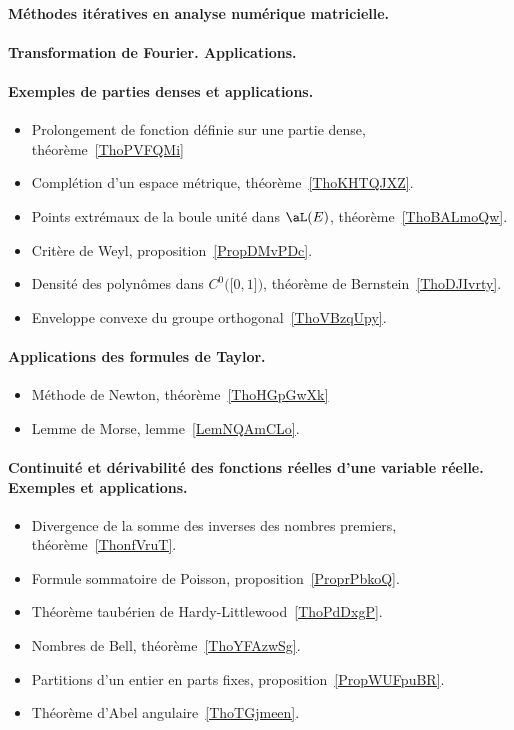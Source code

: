 \paragraph{Méthodes itératives en analyse numérique matricielle.}
\paragraph{Transformation de Fourier. Applications.}
\paragraph{Exemples de parties denses et applications.}
\begin{itemize}
    \item Prolongement de fonction définie sur une partie dense, théorème~\ref{ThoPVFQMi}
    \item Complétion d'un espace métrique, théorème~\ref{ThoKHTQJXZ}.
    \item Points extrémaux de la boule unité dans \( \aL(E)\), théorème~\ref{ThoBALmoQw}.
    \item Critère de Weyl, proposition~\ref{PropDMvPDc}.
    \item Densité des polynômes dans \( C^0\big( \mathopen[ 0 , 1 \mathclose] \big)\), théorème de Bernstein~\ref{ThoDJIvrty}.
    \item Enveloppe convexe du groupe orthogonal~\ref{ThoVBzqUpy}.
\end{itemize}
\paragraph{Applications des formules de Taylor.}
\begin{itemize}
    \item Méthode de Newton, théorème~\ref{ThoHGpGwXk}
    \item Lemme de Morse, lemme~\ref{LemNQAmCLo}.
\end{itemize}
\paragraph{Continuité et dérivabilité des fonctions réelles d'une variable réelle. Exemples et applications.}
\begin{itemize}
    \item Divergence de la somme des inverses des nombres premiers, théorème~\ref{ThonfVruT}.
    \item Formule sommatoire de Poisson, proposition~\ref{ProprPbkoQ}.
    \item Théorème taubérien de Hardy-Littlewood~\ref{ThoPdDxgP}.
    \item Nombres de Bell, théorème~\ref{ThoYFAzwSg}.
    \item Partitions d'un entier en parts fixes, proposition~\ref{PropWUFpuBR}.
    \item Théorème d'Abel angulaire~\ref{ThoTGjmeen}.
\end{itemize}
